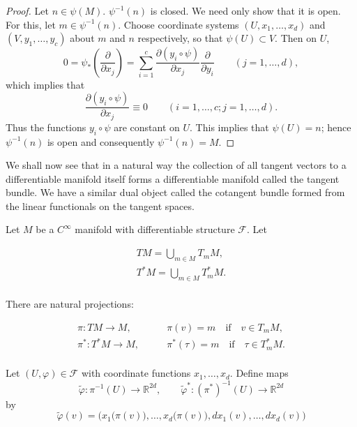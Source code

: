 \begin{proof}
	Let $n\in\psi(M)$. $\psi^{-1}(n)$ is closed. We need only show that it is open. For this, let $m\in\psi^{-1}(n)$. Choose coordinate systems $(U,x_{1},\ldots,x_{d})$ and $(V,y_{1},\ldots,y_{c})$ about $m$ and $n$ respectively, so that $\psi(U)\subset V$. Then on $U$,
	\[
		0=\psi_{*}\left(\frac{\partial}{\partial x_{j}}\right)=\sum_{i=1}^{c}\frac{\partial(y_{i}\circ\psi)}{\partial x_{j}}\frac{\partial}{\partial y_{i}}\qquad(j=1,\ldots,d),
	\]
	which implies that
	\[
		\frac{\partial(y_{i}\circ\psi)}{\partial x_{j}}\equiv0\qquad(i=1,\ldots,c;j=1,\ldots,d).
	\]
	Thus the functions $y_{i}\circ\psi$ are constant on $U$. This implies that $\psi(U)=n$; hence $\psi^{-1}(n)$ is open and consequently $\psi^{-1}(n)=M$.
\end{proof}

We shall now see that in a natural way the collection of all tangent vectors to a differentiable manifold itself forms a differentiable manifold called the tangent bundle. We have a similar dual object called the cotangent bundle formed from the linear functionals on the tangent spaces. 

\label{thm:1.25}
Let $M$ be a $C^{\infty}$ manifold with differentiable structure $\mathcal{F}$. Let

\begin{equation}
	\tag{1}\label{eq:1.25:1}
	\begin{aligned}{TM=\bigcup_{m\in M}T_{m} M,}\\ {T^{*}M=\bigcup_{m\in M}T_{m}^{*} M.}\\ \end{aligned}
\end{equation}

There are natural projections:

\begin{equation}
	\tag{2}\label{eq:1.25:2}
	\begin{aligned}{\pi\colon TM\to M,\qquad}&{{}\pi(v)=m\quad\text{if}\quad v\in T_{m} M,}\\ {\pi^{*}\colon T^{*}M\to M,\qquad}&{{}\pi^{*}(\tau)=m\quad\text{if}\quad\tau\in T_{m}^{*} M.}\\ \end{aligned}
\end{equation}

Let $(U,\varphi)\in\mathcal{F}$ with coordinate functions $x_1,\ldots,x_d$. Define maps
\[
	\tilde\varphi:\pi^{-1}(U)\to\mathbb R^{2d},\qquad
	\tilde\varphi^*:(\pi^*)^{-1}(U)\to\mathbb R^{2d}
\]
by
\[
	\tilde{\varphi}(v)=\big(x_{1}\big(\pi(v)\big),\ldots,x_{d}\big(\pi(v)\big),d x_{1}(v),\ldots,d x_{d}(v)\big)
\]

